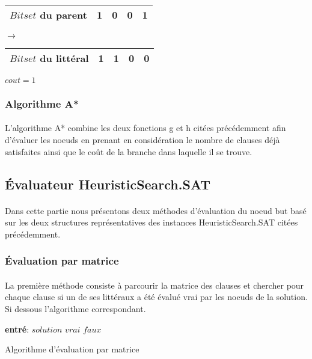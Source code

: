 \begin{minipage}{0.5\textwidth}
	\centering
	\begin{tabular}{|c | c| c| c|c|}
		\hline
		$Bitset$ du parent& {\color{red}1} & 0 & 0 & 1 \\\hline
	\end{tabular}
\end{minipage}
$\rightarrow$
\begin{minipage}{0.5\textwidth}
	\centering
	\begin{tabular}{|c | c| c| c|c|}
		\hline
		$Bitset$ du littéral& {\color{red}1} & 1 & 0 & 0\\\hline
	\end{tabular}
\end{minipage}
\begin{center}
	$cout = 1$
\end{center}

\subsubsection{Algorithme A*}
\paragraph{}
L’algorithme A* combine les deux fonctions g et h citées précédemment afin d’évaluer les noeuds en prenant en considération le nombre de clauses déjà satisfaites ainsi que le coût de la branche dans laquelle il se trouve.
\subsection{Évaluateur HeuristicSearch.SAT}
\paragraph{}
Dans cette partie nous présentons deux méthodes d’évaluation du noeud but basé sur les deux structures représentatives des instances HeuristicSearch.SAT citées précédemment.
\subsubsection{Évaluation par matrice}
\paragraph{}
La première méthode consiste à parcourir la matrice des clauses et chercher pour chaque clause si un de ses littéraux a été évalué vrai par les noeuds de la solution. Si dessous l’algorithme correspondant.\\
\begin{algorithm}
	\SetAlgoLined
	\textbf{entré}: $solution$\;
	{
		\Return $vrai$\;
	}
	\Return $faux$\;
	\caption{Algorithme d'évaluation par matrice}
\end{algorithm}
